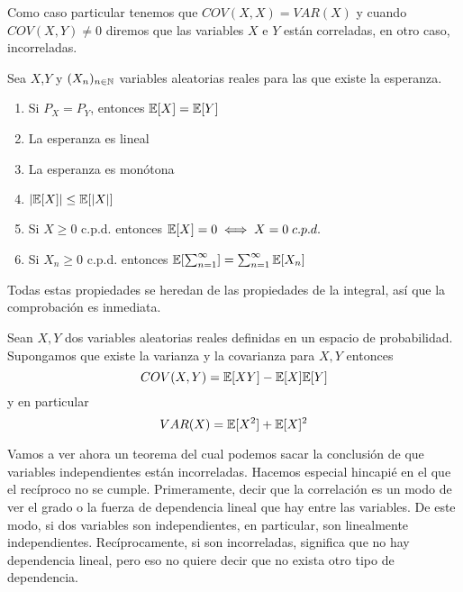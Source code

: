     Como caso particular tenemos que $COV(X,X) = VAR(X)$ y cuando ${COV(X,Y) \not= 0}$ diremos que las variables $X$ e $Y$ están correladas, en otro caso, incorreladas.
       
       
     \begin{proposicion}
     Sea $X$,$Y$ y $(X_n)_{n\in \mathbb{N}}$ variables aleatorias reales para las que existe la esperanza. 
     \begin{enumerate}
         \item Si $P_X = P_Y$, entonces $\mathbb{E}[X] = \mathbb{E}[Y]$
         \item La esperanza es lineal
         \item La esperanza es monótona
         \item $|\mathbb{E}[X]| \leq \mathbb{E}[|X|]$
         \item Si $X \geq 0$ c.p.d. entonces $\mathbb{E}[X] = 0 \iff X = 0 \;  c.p.d.$
         \item Si $X_n \geq 0$ c.p.d. entonces $\mathbb{E}[\sum_{n=1}^{\infty}] = \sum_{n=1}^{\infty} \mathbb{E}[X_n]$
     \end{enumerate}
     \end{proposicion}
     
     Todas estas propiedades se heredan de las propiedades de la integral, así que la comprobación es inmediata.
       
     \begin{proposicion}
     Sean $X,Y$ dos variables aleatorias reales definidas en un espacio de probabilidad. Supongamos que existe la varianza y la covarianza para $X,Y$ entonces
     \begin{equation}
         COV(X,Y)= \mathbb{E}[XY] - \mathbb{E}[X]\mathbb{E}[Y]
     \end{equation}
     \noindent y en particular
     \begin{equation}
         VAR(X)= \mathbb{E}[X^2] + \mathbb{E}[X]^2
     \end{equation}
     \end{proposicion}
     
     Vamos a ver ahora un teorema del cual podemos sacar la conclusión de que variables independientes están incorreladas. Hacemos especial hincapié en el que el recíproco no se cumple. Primeramente, decir que la correlación es un modo de ver el grado o la fuerza de dependencia lineal que hay entre las variables. De este modo, si dos variables son independientes, en particular, son linealmente independientes. Recíprocamente, si son incorreladas, significa que no hay dependencia lineal, pero eso no quiere decir que no exista otro tipo de dependencia.
     
